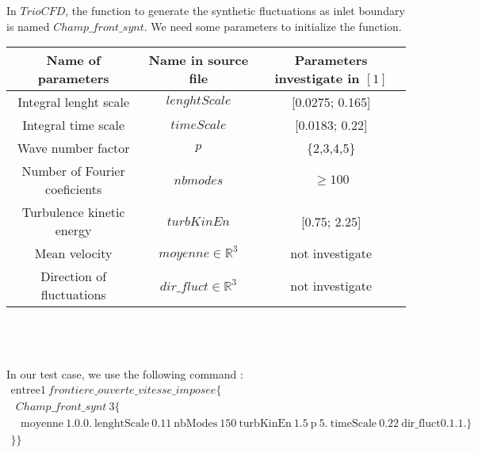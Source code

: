 In $TrioCFD$, the function to generate the synthetic fluctuations as inlet boundary is named $Champ\_front\_synt$. We need some parameters to initialize the function.

\begin{tabular}{|c|c|c|}
\hline 
\textbf{Name of parameters} & \textbf{Name in source file} & \textbf{Parameters investigate in $[1]$} \\ 
\hline 
Integral lenght scale & $lenghtScale$ & [0.0275; 0.165] \\ 
\hline 
Integral time scale & $timeScale$ & [0.0183; 0.22] \\ 
\hline 
Wave number factor & $p$ & \{2,3,4,5\} \\ 
\hline 
Number of Fourier coeficients & $nbmodes$ & $\geq 100$ \\ 
\hline 
Turbulence kinetic energy & $turbKinEn$ & [0.75; 2.25] \\ 
\hline 
Mean velocity & $moyenne \in \mathbb{R}^3$ & not investigate \\
\hline
Direction of fluctuations & $dir\_fluct \in \mathbb{R}^3$ & not investigate \\
\hline
\end{tabular} 
\\
\\
\\
\medskip
In our test case, we use the following command :
$$
\begin{array}{ll}
\text{entree1} \ frontiere\_ouverte\_vitesse\_imposee \{ \\ 
\ \ Champ\_front\_synt \ 3 \{ \\ 
\ \ \ \ \text{moyenne} \ 1. 0. 0. \ \text{lenghtScale} \ 0.11 \ \text{nbModes} \ 150 \ \text{turbKinEn} \ 1.5 \ \text{p} \ 5. \ \text{timeScale} \ 0.22 \ \text{dir\_fluct} 0. 1. 1. \} \\
\} \}
\end{array}
$$

